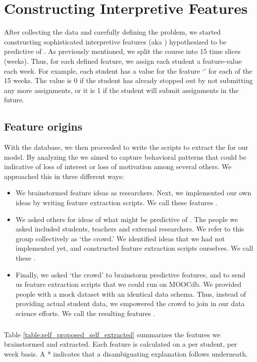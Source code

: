\chapter{Constructing Interpretive Features}\label{chap:features}

After collecting the data and carefully defining the problem, we started constructing sophisticated interpretive features (aka \cov) hypothesized to be predictive of \sti. As previously mentioned, we split the course into 15 time slices (weeks). Thus, for each defined feature, we assign each student a feature-value each week. For example, each student has a value for the feature ‘\sti’ for each of the 15 weeks. The value is 0 if the student has already stopped out by not submitting any more assignments, or it is 1 if the student will submit assignments in the future.

\section{Feature origins}

With the database, we then proceeded to write the scripts to extract the \cov for our model. By analyzing the \cov we aimed to capture behavioral patterns that could be indicative of loss of interest or loss of motivation among several others. We approached this in three different ways:

\begin{itemize}
\item We brainstormed feature ideas as researchers. Next, we implemented our own ideas by writing feature extraction scripts. We call these features \selfself.
\item We asked others for ideas of what might be predictive of \sti. The people we asked included students, teachers and external researchers. We refer to this group collectively as `the crowd.' We identified ideas that we had not implemented yet, and constructed feature extraction scripts ourselves. We call these \crowdself.
\item Finally, we asked `the crowd' to brainstorm predictive features, and to send us feature extraction scripts that we could run on MOOCdb. We provided people with a mock dataset with an identical data schema. Thus, instead of providing actual student data, we empowered the crowd to join in our data science efforts. We call the resulting features \crowdcrowd.
\end{itemize}


\subsection{\selfself}
Table \ref{table:self_proposed_self_extracted} summarizes the features we brainstormed and extracted. Each feature is calculated on a per student, per week basis. A * indicates that a disambiguating explanation follows underneath.

